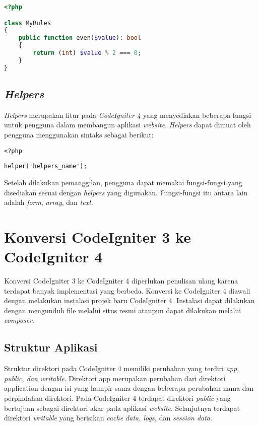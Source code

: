 \begin{lstlisting}[language=PHP, caption=Contoh kode pembentukan aturan secara manual pada file \texttt{Validation.php}. ,label=kode:ci4validationrulesmanual]
<?php

class MyRules
{
    public function even($value): bool
    {
        return (int) $value % 2 === 0;
    }
}
\end{lstlisting}

\subsection{\textit{Helpers}}
\textit{Helpers} merupakan fitur pada \textit{CodeIgniter 4} yang menyediakan beberapa fungsi untuk pengguna dalam membangun aplikasi \textit{website}. \textit{Helpers} dapat dimuat oleh pengguna menggunakan sintaks sebagai berikut:

\begin{center}
\verb|<?php|

\verb|helper('helpers_name');|
\end{center}
Setelah dilakukan pemanggilan, pengguna dapat memakai fungsi-fungsi yang disediakan sesuai dengan \textit{helpers} yang digunakan. Fungsi-fungsi itu antara lain adalah \textit{form}, \textit{array}, dan \textit{text}.

\section{Konversi CodeIgniter 3 ke CodeIgniter 4\cite{codeigniter:23:ci4}}
\label{sec:konversici3c4}
 
Konversi CodeIgniter 3 ke CodeIgniter 4 diperlukan penulisan ulang karena terdapat banyak implementasi yang berbeda. Konversi ke CodeIgniter 4 diawali dengan melakukan instalasi projek baru CodeIgniter 4. Instalasi dapat dilakukan dengan mengunduh file melalui situs resmi ataupun dapat dilakukan melalui \textit{composer}.


\subsection{Struktur Aplikasi}

Struktur direktori pada CodeIgniter 4 memiliki perubahan yang terdiri \textit{app, public, dan writable}. Direktori app merupakan perubahan dari direktori application dengan isi yang hampir sama dengan beberapa perubahan nama dan perpindahan direktori. Pada CodeIgniter 4 terdapat direktori \textit{public} yang bertujuan sebagai direktori akar pada aplikasi \textit{website}. Selanjutnya terdapat direktori \textit{writable} yang berisikan \textit{cache data, logs,} dan \textit{session data}.

